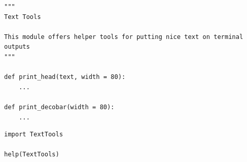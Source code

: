 
\begin{frame}[fragile]
%
\begin{codebox}
\begin{verbatim}
""" 
Text Tools

This module offers helper tools for putting nice text on terminal outputs
"""

def print_head(text, width = 80):
    ...

def print_decobar(width = 80):
    ...
\end{verbatim}
\end{codebox}
%
\begin{codebox}
\begin{verbatim}
import TextTools

help(TextTools)
\end{verbatim}
\end{codebox}
%
\end{frame}


